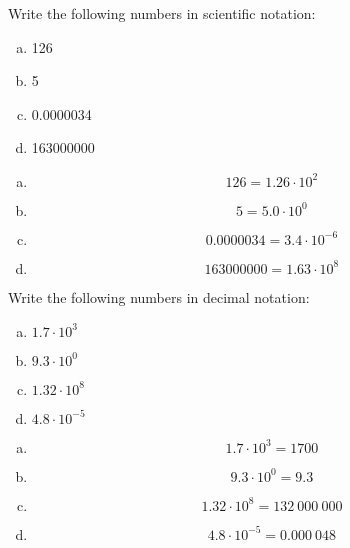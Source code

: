 \documentclass[11pt,letterpaper]{article}
\begin{document}

 Write the following numbers in scientific notation:
	\begin{enumerate}[(a)]
	\item 126
	\item 5
	\item 0.0000034
	\item 163000000
	\end{enumerate} \pspace

\sol
\begin{enumerate}[(a)]
\item 
	\[
	126= 1.26 \cdot 10^2
	\] \pspace

\item 
	\[
	5= 5.0 \cdot 10^0
	\] \pspace

\item 
	\[
	0.0000034= 3.4 \cdot 10^{-6}
	\] \pspace

\item 
	\[
	163000000= 1.63 \cdot 10^8
	\]
\end{enumerate}



\newpage



 Write the following numbers in decimal notation:
	\begin{enumerate}[(a)]
	\item $1.7 \cdot 10^3$
	\item $9.3 \cdot 10^0$
	\item $1.32 \cdot 10^8$
	\item $4.8 \cdot 10^{-5}$
	\end{enumerate} \pspace

\sol
\begin{enumerate}[(a)]
\item 
	\[
	1.7 \cdot 10^3= 1700
	\] \pspace

\item 
	\[
	9.3 \cdot 10^0= 9.3
	\] \pspace

\item 
	\[
	1.32 \cdot 10^8= 132\ 000\ 000
	\] \pspace

\item 
	\[
	4.8 \cdot 10^{-5}= 0.000\ 048
	\]
\end{enumerate}



\newpage
\end{document}
